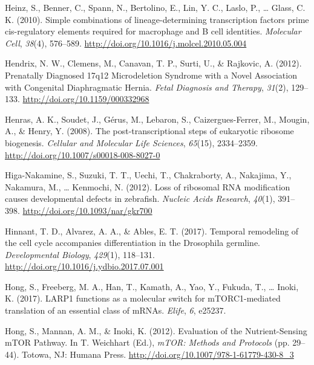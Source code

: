 \documentclass[12pt,twoside]{reedthesis}
\newlength{\cslhangindent}
\newenvironment{cslreferences}%
  {\setlength{\parindent}{0pt}%
  \everypar{\setlength{\hangindent}{\cslhangindent}}\ignorespaces}%
  {\par}
\begin{document}
\begin{cslreferences}
\leavevmode\hypertarget{ref-heinzSimpleCombinationsLineagedetermining2010}{}%
Heinz, S., Benner, C., Spann, N., Bertolino, E., Lin, Y. C., Laslo, P., \ldots{} Glass, C. K. (2010). Simple combinations of lineage-determining transcription factors prime cis-regulatory elements required for macrophage and B cell identities. \emph{Molecular Cell}, \emph{38}(4), 576--589. \url{http://doi.org/10.1016/j.molcel.2010.05.004}

\leavevmode\hypertarget{ref-hendrixPrenatallyDiagnosed17q122012}{}%
Hendrix, N. W., Clemens, M., Canavan, T. P., Surti, U., \& Rajkovic, A. (2012). Prenatally Diagnosed 17q12 Microdeletion Syndrome with a Novel Association with Congenital Diaphragmatic Hernia. \emph{Fetal Diagnosis and Therapy}, \emph{31}(2), 129--133. \url{http://doi.org/10.1159/000332968}

\leavevmode\hypertarget{ref-Henras2008c}{}%
Henras, A. K., Soudet, J., Gérus, M., Lebaron, S., Caizergues-Ferrer, M., Mougin, A., \& Henry, Y. (2008). The post-transcriptional steps of eukaryotic ribosome biogenesis. \emph{Cellular and Molecular Life Sciences}, \emph{65}(15), 2334--2359. \url{http://doi.org/10.1007/s00018-008-8027-0}

\leavevmode\hypertarget{ref-Higa-Nakamine2012o}{}%
Higa-Nakamine, S., Suzuki, T. T., Uechi, T., Chakraborty, A., Nakajima, Y., Nakamura, M., \ldots{} Kenmochi, N. (2012). Loss of ribosomal RNA modification causes developmental defects in zebrafish. \emph{Nucleic Acids Research}, \emph{40}(1), 391--398. \url{http://doi.org/10.1093/nar/gkr700}

\leavevmode\hypertarget{ref-hinnantTemporalRemodelingCell2017}{}%
Hinnant, T. D., Alvarez, A. A., \& Ables, E. T. (2017). Temporal remodeling of the cell cycle accompanies differentiation in the Drosophila germline. \emph{Developmental Biology}, \emph{429}(1), 118--131. \url{http://doi.org/10.1016/j.ydbio.2017.07.001}

\leavevmode\hypertarget{ref-Hong2017a}{}%
Hong, S., Freeberg, M. A., Han, T., Kamath, A., Yao, Y., Fukuda, T., \ldots{} Inoki, K. (2017). LARP1 functions as a molecular switch for mTORC1-mediated translation of an essential class of mRNAs. \emph{Elife}, \emph{6}, e25237.

\leavevmode\hypertarget{ref-hongEvaluationNutrientSensingMTOR2012}{}%
Hong, S., Mannan, A. M., \& Inoki, K. (2012). Evaluation of the Nutrient-Sensing mTOR Pathway. In T. Weichhart (Ed.), \emph{mTOR: Methods and Protocols} (pp. 29--44). Totowa, NJ: Humana Press. \url{http://doi.org/10.1007/978-1-61779-430-8_3}


\end{cslreferences}
\end{document}
